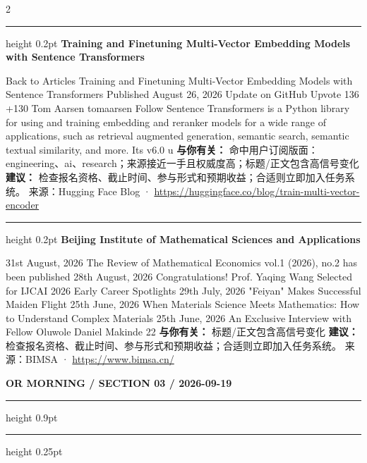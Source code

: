 \documentclass[10.5pt]{ctexart}
\begin{document}
\begin{multicols}{2}
\vspace{2mm}
\hrule height 0.2pt
\vspace{2mm}
{\large\bfseries Training and Finetuning Multi-Vector Embedding Models with Sentence Transformers}\par
Back to Articles Training and Finetuning Multi-Vector Embedding Models with Sentence Transformers Published August 26, 2026 Update on GitHub Upvote 136 +130 Tom Aarsen tomaarsen Follow Sentence Transformers is a Python library for using and training embedding and reranker models for a wide range of applications, such as retrieval augmented generation, semantic search, semantic textual similarity, and more. Its v6.0 u
\textbf{与你有关：} 命中用户订阅版面：engineering、ai、research；来源接近一手且权威度高；标题/正文包含高信号变化
\textbf{建议：} 检查报名资格、截止时间、参与形式和预期收益；合适则立即加入任务系统。
{\footnotesize\color{ormuted} 来源：Hugging Face Blog · \url{https://huggingface.co/blog/train-multi-vector-encoder}}
\vspace{2mm}
\hrule height 0.2pt
\vspace{2mm}
{\large\bfseries Beijing Institute of Mathematical Sciences and Applications}\par
31st August, 2026 The Review of Mathematical Economics vol.1 (2026), no.2 has been published 28th August, 2026 Congratulations! Prof. Yaqing Wang Selected for IJCAI 2026 Early Career Spotlights 29th July, 2026 "Feiyan" Makes Successful Maiden Flight 25th June, 2026 When Materials Science Meets Mathematics: How to Understand Complex Materials 25th June, 2026 An Exclusive Interview with Fellow Oluwole Daniel Makinde 22
\textbf{与你有关：} 标题/正文包含高信号变化
\textbf{建议：} 检查报名资格、截止时间、参与形式和预期收益；合适则立即加入任务系统。
{\footnotesize\color{ormuted} 来源：BIMSA · \url{https://www.bimsa.cn/}}
\end{multicols}
\newpage
{\small\bfseries OR MORNING / SECTION 03 / 2026-09-19}
\vspace{2mm}
\hrule height 0.9pt
\vspace{1.5mm}
\hrule height 0.25pt
\vspace{4mm}
\end{document}
